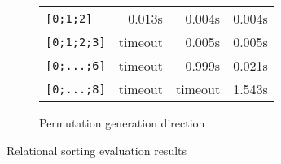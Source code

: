 \begin{figure*}[t!]
\begin{subfigure}[b]{0.48\textwidth}
\begin{tabular}{l||c|r||r}
      \texttt{{[}0;1;2{]}}   & \multicolumn{1}{r|}{0.013s}                                                    & 0.004s                                                                         & 0.004s                                          \\
      \texttt{{[}0;1;2;3{]}} & timeout                                                                       & 0.005s                                                                         & 0.005s                                          \\
      \texttt{{[}0;...;6{]}}  & timeout                                                                       & 0.999s                                                                         & 0.021s                                          \\
      \texttt{{[}0;...;8{]}} & timeout                                                                       & \multicolumn{1}{c||}{timeout}                                                   & 1.543s
      \end{tabular}
    \caption{Permutation generation direction}
    \label{tbl:sort_perm}
  \end{subfigure}
  \caption{Relational sorting evaluation results}
  \label{tbl:sort}
\end{figure*}

